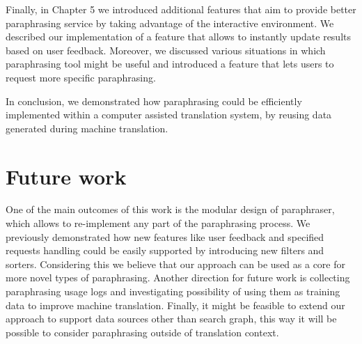 Finally, in Chapter 5 we introduced additional features that aim to provide better paraphrasing service by taking advantage of the interactive environment. We described our implementation of a feature that allows to instantly update results based on user feedback. Moreover, we discussed various situations in which paraphrasing tool might be useful and introduced a feature that lets users to request more specific paraphrasing.

In conclusion, we demonstrated how paraphrasing could be efficiently implemented within a computer assisted translation system, by reusing data generated during machine translation. 

\section{Future work}

One of the main outcomes of this work is the modular design of paraphraser, which allows to re-implement any part of the paraphrasing process. We previously demonstrated how new features like user feedback and specified requests handling could be easily supported by introducing new filters and sorters. Considering this we believe that our approach can be used as a core for more novel types of paraphrasing. Another direction for future work is collecting paraphrasing usage logs and investigating possibility of using them as training data to improve machine translation. Finally, it might be feasible to extend our approach to support data sources other than search graph, this way it will be possible to consider paraphrasing outside of translation context.  